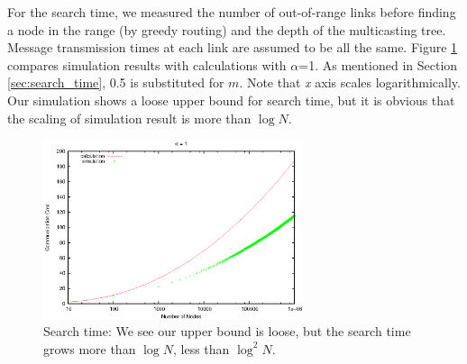\documentclass[conference]{IEEEtran}
\begin{document}
For the search time, we measured the number of out-of-range links before finding 
a node in the range (by greedy routing) and the depth of the multicasting tree. Message 
transmission times at each link are assumed to be all the same. Figure \ref{fig:time} %
compares simulation results with calculations with $\alpha$=1. 
As mentioned in Section \ref{sec:search_time}, 0.5 is substituted for $m$. 
Note that \textit{x} axis scales logarithmically. Our simulation shows a loose upper bound for search time, 
but it is obvious that the scaling of simulation result is more than 
$\log N$.
\begin{figure}
\centering
\includegraphics[width=3in]{time1}
\caption{Search time: We see our upper bound is loose, but the search time grows 
more than $\log N$, less than $\log^2 N$.} \label{fig:time}
\end{figure}



\iffalse
\end{document}
